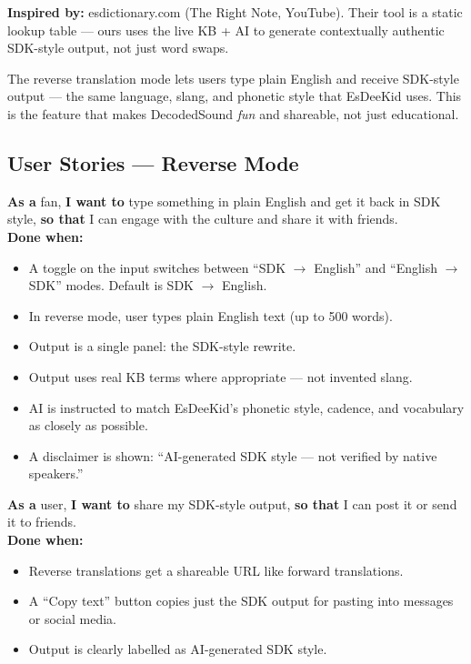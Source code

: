 \documentclass[12pt, a4paper]{article}
\begin{document}
\begin{tcolorbox}[accentbox]
  \textbf{Inspired by:} esdictionary.com (The Right Note, YouTube). Their
  tool is a static lookup table — ours uses the live KB + AI to generate
  contextually authentic SDK-style output, not just word swaps.
\end{tcolorbox}

\vspace{0.6em}

The reverse translation mode lets users type plain English and receive
SDK-style output — the same language, slang, and phonetic style that
EsDeeKid uses. This is the feature that makes DecodedSound \textit{fun}
and shareable, not just educational.

\subsection{User Stories — Reverse Mode}

\begin{tcolorbox}[storybox, title={US-17 — Translate English to SDK Style}]
  \textbf{As a} fan, \textbf{I want to} type something in plain English and
  get it back in SDK style, \textbf{so that} I can engage with the culture
  and share it with friends.\\[0.4em]
  \textbf{Done when:}
  \begin{itemize}
    \item A toggle on the input switches between ``SDK $\to$ English'' and
          ``English $\to$ SDK'' modes. Default is SDK $\to$ English.
    \item In reverse mode, user types plain English text (up to 500 words).
    \item Output is a single panel: the SDK-style rewrite.
    \item Output uses real KB terms where appropriate — not invented slang.
    \item AI is instructed to match EsDeeKid's phonetic style, cadence,
          and vocabulary as closely as possible.
    \item A disclaimer is shown: ``AI-generated SDK style — not verified
          by native speakers.''
  \end{itemize}
\end{tcolorbox}

\begin{tcolorbox}[storybox, title={US-18 — Share a Reverse Translation}]
  \textbf{As a} user, \textbf{I want to} share my SDK-style output,
  \textbf{so that} I can post it or send it to friends.\\[0.4em]
  \textbf{Done when:}
  \begin{itemize}
    \item Reverse translations get a shareable URL like forward translations.
    \item A ``Copy text'' button copies just the SDK output for pasting
          into messages or social media.
    \item Output is clearly labelled as AI-generated SDK style.
  \end{itemize}
\end{tcolorbox}
\end{document}
